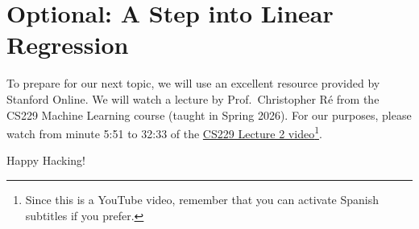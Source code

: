 \documentclass{article}
\begin{document}
\section*{Optional: A Step into Linear Regression}
To prepare for our next topic, we will use an excellent resource provided by Stanford Online. We will watch a lecture by Prof.~Christopher Ré from the CS229 Machine Learning course (taught in Spring 2026). For our purposes, please watch from minute 5:51 to 32:33 of the \href{https://youtu.be/cmNIMjPYdgM?t=351}{CS229 Lecture 2 video}\footnote{Since this is a YouTube video, remember that you can activate Spanish subtitles if you prefer.}.

\vspace{5mm}
Happy Hacking! 
\end{document}
